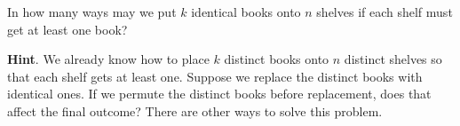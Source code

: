 \documentclass{book}
\begin{document}
\setcounter{cpjt}{127}
\addtocounter{cpjt}{-1}
\begin{activity}\label{activity-120}
\hypertarget{p-859}{}%
In how many ways may we put \(k\) identical books onto \(n\) shelves if each shelf must get at least one book?%
\par\smallskip%
\noindent\textbf{Hint}.\hypertarget{hint-85}{}\quad%
\hypertarget{p-860}{}%
We already know how to place \(k\) distinct books onto \(n\) distinct shelves so that each shelf gets at least one. Suppose we replace the distinct books with identical ones. If we permute the distinct books before replacement, does that affect the final outcome? There are other ways to solve this problem.%
\par\smallskip%
\noindent\end{activity}

\clearpage
\end{document}
